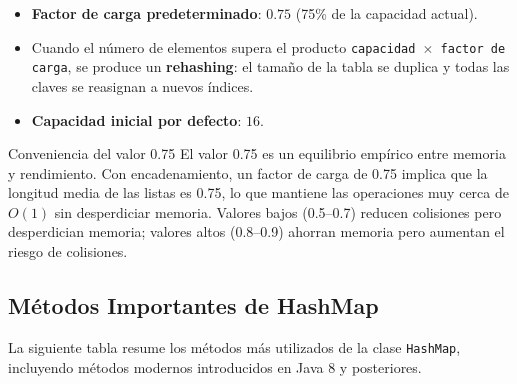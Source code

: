 \begin{itemize}
    \item \textbf{Factor de carga predeterminado}: \(0.75\) (75\% de la capacidad actual).
    \item Cuando el número de elementos supera el producto \texttt{capacidad \(\times\) factor de carga}, se produce un \textbf{rehashing}: el tamaño de la tabla se duplica y todas las claves se reasignan a nuevos índices.
    \item \textbf{Capacidad inicial por defecto}: \(16\).
\end{itemize}

\begin{observacion}{Conveniencia del valor 0.75}
El valor 0.75 es un equilibrio empírico entre memoria y rendimiento. Con encadenamiento, un factor de carga de 0.75 implica que la longitud media de las listas es 0.75, lo que mantiene las operaciones muy cerca de \(O(1)\) sin desperdiciar memoria. Valores bajos (0.5–0.7) reducen colisiones pero desperdician memoria; valores altos (0.8–0.9) ahorran memoria pero aumentan el riesgo de colisiones.
\end{observacion}

\subsection{Métodos Importantes de HashMap}
\label{subsec:metodos-hashmap}

La siguiente tabla resume los métodos más utilizados de la clase \texttt{HashMap}, incluyendo métodos modernos introducidos en Java 8 y posteriores.

